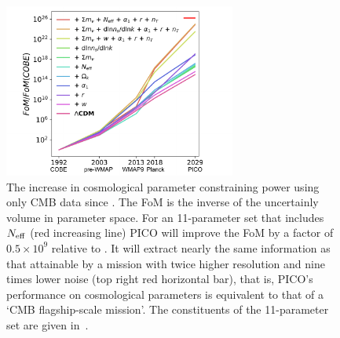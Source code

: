 \documentclass[PICOAPC.tex]{subfiles}
\begin{document}
 \begin{figure}%
\hspace{-0.2in}
\parbox{2.7in}{\centerline {
\includegraphics[width=3.0in]{images/fom_plot_CVL+del.pdf} } }
\hspace{0.in}
\parbox{3.8in}{
\caption{\captiontext 
The increase in cosmological parameter constraining power using only CMB data since \cobe . The FoM is the inverse of the uncertainly volume in parameter space. 
For an 11-parameter set that includes ${N_{\rm eff}}$ (red increasing line) PICO will improve the FoM by a factor of $0.5\times10^{9}$ relative to \planck . It will extract nearly the same information as that attainable by a mission with twice higher resolution and nine times lower noise (top right red horizontal bar), that is, PICO's performance on cosmological parameters is equivalent to that of a `CMB flagship-scale mission'. The constituents of the 11-parameter set are given in~\citet{pico_report}. 
\label{fig:fom} } }
\vspace{-0.13in}
\end{figure}
\end{document}
